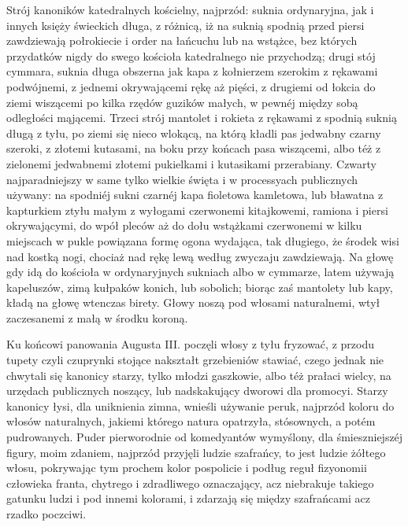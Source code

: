 \documentclass{book}
\begin{document}
Strój kanoników katedralnych kościelny, najprzód: suknia ordynaryjna, jak i innych księży świeckich długa, z różnicą, iż na suknią spodnią przed piersi zawdziewają połrokiecie i order na łańcuchu lub na wstążce, bez których przydatków nigdy do swego kościoła katedralnego nie przychodzą; drugi stój cymmara, suknia długa obszerna jak kapa z kołnierzem szerokim z rękawami podwójnemi, z jednemi okrywającemi rękę aż pięści, z drugiemi od łokcia do ziemi wiszącemi po kilka rzędów guzików małych, w pewnéj między sobą odległości mąjącemi. Trzeci strój mantolet i rokieta z rękawami z spodnią suknią długą z tyłu, po ziemi się nieco wlokącą, na którą kładli pas jedwabny czarny szeroki, z złotemi kutasami, na boku przy końcach pasa wiszącemi, albo téż z zielonemi jedwabnemi złotemi pukielkami i kutasikami przerabiany. Czwarty najparadniejszy w same tylko wielkie święta i w processyach publicznych używany: na spodniéj sukni czarnéj kapa fioletowa kamletowa, lub bławatna z kapturkiem ztyłu małym z wyłogami czerwonemi kitajkowemi, ramiona i piersi okrywającymi, do wpół pleców aż do dołu wstążkami czerwonemi w kilku miejscach w pukle powiązana formę ogona wydająca, tak długiego, że środek wisi nad kostką nogi, chociaż nad rękę lewą według zwyczaju zawdziewają. Na głowę gdy idą do kościoła w ordynaryjnych sukniach albo w cymmarze, latem używają kapeluszów, zimą kułpaków konich, lub sobolich; biorąc zaś mantolety lub kapy, kładą na głowę wtenczas birety. Głowy noszą pod włosami naturalnemi, wtył zaczesanemi z małą w środku koroną.

Ku końcowi panowania Augusta III. poczęli włosy z tyłu fryzować, z przodu tupety czyli czuprynki stojące nakształt grzebieniów stawiać, czego jednak nie chwytali się kanonicy starzy, tylko młodzi gaszkowie, albo téż prałaci wielcy, na urzędach publicznych noszący, lub nadskakujący dworowi dla promocyi. Starzy kanonicy łysi, dla uniknienia zimna, wnieśli używanie peruk, najprzód koloru do włosów naturalnych, jakiemi którego natura opatrzyła, stósownych, a potém pudrowanych. Puder pierworodnie od komedyantów wymyślony, dla śmieszniejszéj figury, moim zdaniem, najprzód przyjęli ludzie szafrańcy, to jest ludzie żółtego włosu, pokrywając tym prochem kolor pospolicie i podług reguł fizyonomii człowieka franta, chytrego i zdradliwego oznaczający, acz niebrakuje takiego gatunku ludzi i pod innemi kolorami, i zdarzają się między szafrańcami acz rzadko poczciwi.
\end{document}

